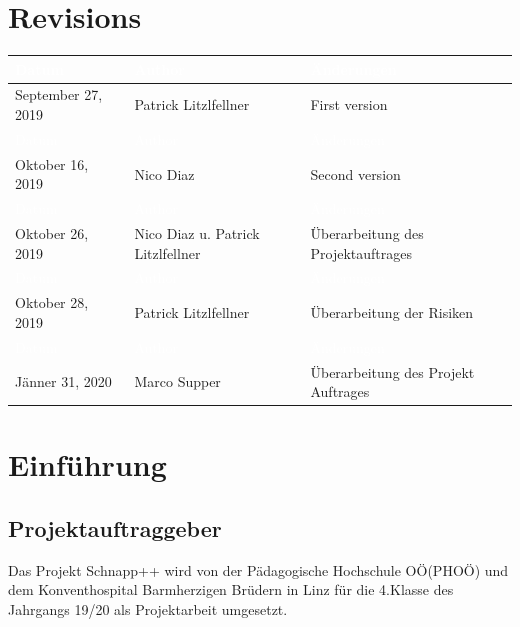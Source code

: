 \documentclass[12pt]{article}
\theoremstyle{definition}
\begin{document}
\section*{Revisions}
\begin{tabular}{|l|l|l|}
\hline
\cellcolor[gray]{0.5}\textcolor{white}{Datum} & \cellcolor[gray]{0.5}\textcolor{white}{Author} & \cellcolor[gray]{0.5}\textcolor{white}{Änderungen} \\ \hline
September 27, 2019&Patrick Litzlfellner &First version \\ \hline
\cellcolor[gray]{0.5}\textcolor{white}{Datum} & \cellcolor[gray]{0.5}\textcolor{white}{Author} & \cellcolor[gray]{0.5}\textcolor{white}{Änderungen} \\ \hline
Oktober 16, 2019&Nico Diaz &Second version \\ \hline
\cellcolor[gray]{0.5}\textcolor{white}{Datum} & \cellcolor[gray]{0.5}\textcolor{white}{Author} & \cellcolor[gray]{0.5}\textcolor{white}{Änderungen} \\ \hline
Oktober 26, 2019&Nico Diaz u. Patrick Litzlfellner &Überarbeitung des Projektauftrages \\ \hline
\cellcolor[gray]{0.5}\textcolor{white}{Datum} & \cellcolor[gray]{0.5}\textcolor{white}{Author} & \cellcolor[gray]{0.5}\textcolor{white}{Änderungen} \\ \hline
Oktober 28, 2019&Patrick Litzlfellner & Überarbeitung der Risiken \\ \hline
\cellcolor[gray]{0.5}\textcolor{white}{Datum} & \cellcolor[gray]{0.5}\textcolor{white}{Author} & \cellcolor[gray]{0.5}\textcolor{white}{Änderungen} \\ \hline 
Jänner 31, 2020&Marco Supper & Überarbeitung des Projekt Auftrages \\ \hline
\end{tabular}
\pagebreak

\tableofcontents
\pagebreak

\section{Einführung}

\subsection{Projektauftraggeber}
Das Projekt Schnapp++ wird von der Pädagogische Hochschule OÖ(PHOÖ) und dem Konventhospital Barmherzigen Brüdern in Linz für die 4.Klasse des Jahrgangs 19/20 als Projektarbeit umgesetzt. 
\newline
\end{document}
